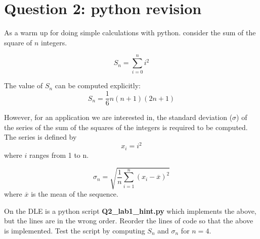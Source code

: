 \section*{Question 2: python revision}

As a warm up for doing simple calculations with python.
consider the sum of the square of $n$ integers.

$$
S_n = \sum_{i=0}^{n} i^2
$$

The value of $S_n$ can be computed explicitly:
$$
S_n = \frac{1}{6} n (n+1) (2n+1)
$$

However, for an application we are interested in, the 
standard deviation ($\sigma$)
of the series of the sum of the squares
of the integers is required to be computed.
The series is defined by
$$
x_i = i^2
$$
where $i$ ranges from 1 to n.

$$
\sigma_n = \sqrt{ \frac{1}{n}  \sum_{i=1}^{n} ( x_i - \overline{x} )^2      }
$$
where  $\overline{x}$ is the mean of the sequence.


On the DLE is a python script \textbf{Q2\_lab1\_hint.py} which implements the above,
but the lines are in the wrong order. Reorder the lines of code so
that the above is implemented.  Test the script by computing $S_n$
and $\sigma_n$ for $n=4$.



